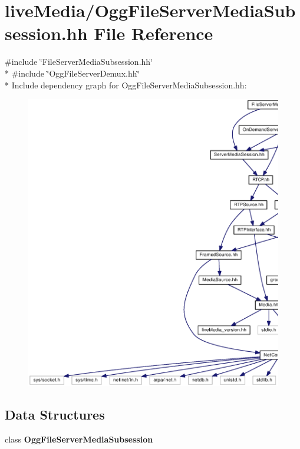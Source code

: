 \section{live\+Media/\+Ogg\+File\+Server\+Media\+Subsession.hh File Reference}
\label{OggFileServerMediaSubsession_8hh}
{\ttfamily \#include \char`\"{}File\+Server\+Media\+Subsession.\+hh\char`\"{}}\\*
{\ttfamily \#include \char`\"{}Ogg\+File\+Server\+Demux.\+hh\char`\"{}}\\*
Include dependency graph for Ogg\+File\+Server\+Media\+Subsession.\+hh\+:
\nopagebreak
\begin{figure}[H]
\begin{center}
\leavevmode
\includegraphics[width=350pt]{OggFileServerMediaSubsession_8hh__incl}
\end{center}
\end{figure}
\subsection*{Data Structures}
\begin{DoxyCompactItemize}
\item 
class {\bf Ogg\+File\+Server\+Media\+Subsession}
\end{DoxyCompactItemize}
